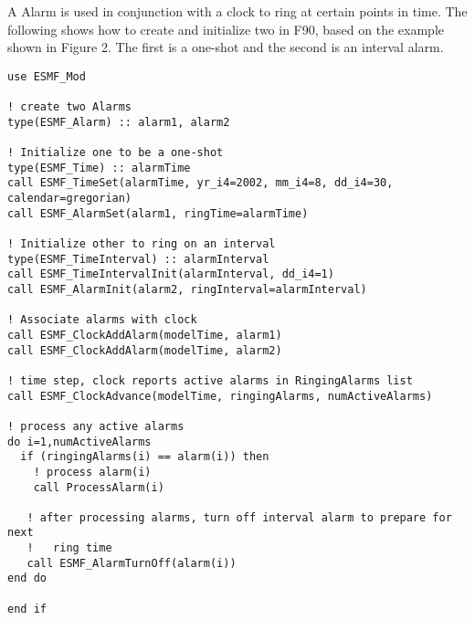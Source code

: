 
A Alarm is used in conjunction with a clock to ring at certain points in time.
The following shows how to create and initialize two in F90, based on the
example shown in Figure 2.  The first is a one-shot and the second is an
interval alarm.

\begin{verbatim}
use ESMF_Mod

! create two Alarms
type(ESMF_Alarm) :: alarm1, alarm2

! Initialize one to be a one-shot
type(ESMF_Time) :: alarmTime
call ESMF_TimeSet(alarmTime, yr_i4=2002, mm_i4=8, dd_i4=30, calendar=gregorian)
call ESMF_AlarmSet(alarm1, ringTime=alarmTime)

! Initialize other to ring on an interval
type(ESMF_TimeInterval) :: alarmInterval
call ESMF_TimeIntervalInit(alarmInterval, dd_i4=1)
call ESMF_AlarmInit(alarm2, ringInterval=alarmInterval)

! Associate alarms with clock
call ESMF_ClockAddAlarm(modelTime, alarm1)
call ESMF_ClockAddAlarm(modelTime, alarm2)

! time step, clock reports active alarms in RingingAlarms list
call ESMF_ClockAdvance(modelTime, ringingAlarms, numActiveAlarms)

! process any active alarms
do i=1,numActiveAlarms
  if (ringingAlarms(i) == alarm(i)) then
    ! process alarm(i)
    call ProcessAlarm(i)

   ! after processing alarms, turn off interval alarm to prepare for next
   !   ring time
   call ESMF_AlarmTurnOff(alarm(i))
end do

end if
\end{verbatim}
